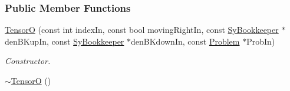 \subsubsection*{Public Member Functions}
\begin{DoxyCompactItemize}
\item 
\hyperlink{classCheMPS2_1_1TensorO_aeaeec50f3d3884825930dc72e8be4af8}{Tensor\-O} (const int index\-In, const bool moving\-Right\-In, const \hyperlink{classCheMPS2_1_1SyBookkeeper}{Sy\-Bookkeeper} $\ast$den\-B\-Kup\-In, const \hyperlink{classCheMPS2_1_1SyBookkeeper}{Sy\-Bookkeeper} $\ast$den\-B\-Kdown\-In, const \hyperlink{classCheMPS2_1_1Problem}{Problem} $\ast$Prob\-In)
\begin{DoxyCompactList}\small\item\em Constructor. \end{DoxyCompactList}\item 
\hypertarget{classCheMPS2_1_1TensorO_afec8d0c1a768497508d9298bd4cc036a}{\hyperlink{classCheMPS2_1_1TensorO_afec8d0c1a768497508d9298bd4cc036a}{$\sim$\-Tensor\-O} ()}\label{classCheMPS2_1_1TensorO_afec8d0c1a768497508d9298bd4cc036a}


\end{DoxyCompactItemize}
